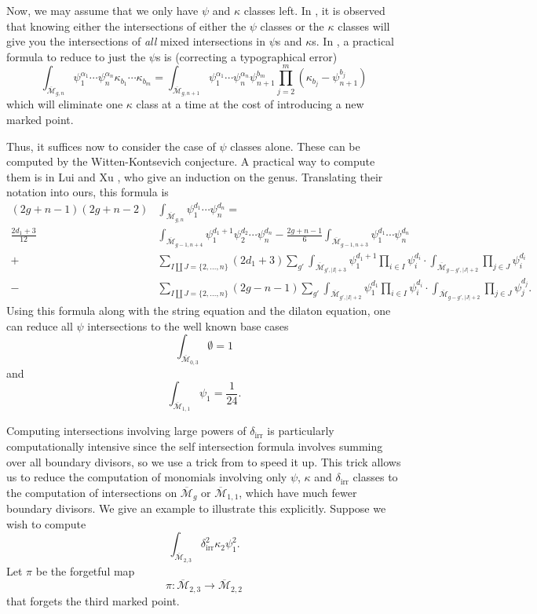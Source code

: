 \documentclass{amsart}
\newcommand{\M}[2]{\overline{\mathcal M}_{{#1},{#2}}}
\newcommand{\Mgn}{\M gn}
\newcommand{\di}{\delta_{\text{irr}}}
\begin{document}
Now, we may assume that we only have $\psi$ and $\kappa$ classes left.  In \cite{AC}, it is observed that knowing either the intersections of either the $\psi$ classes or the $\kappa$ classes will give you the intersections of \emph{all} mixed intersections in $\psi$s and $\kappa$s.  In \cite{yang}, a practical formula to reduce to just the $\psi$s is (correcting a typographical error)
\[
\int_{\Mgn} \psi_1^{\alpha_1} \cdots \psi_n^{\alpha_n} \kappa_{b_1} \cdots \kappa_{b_m} = \int_{\M{g}{n+1}}  \psi_1^{\alpha_1} \cdots \psi_n^{\alpha_n}\psi_{n+1}^{b_m} \prod_{j = 2}^m (\kappa_{b_j} - \psi_{n+1}^{b_j})
\]
which will eliminate one $\kappa$ class at a time at the cost of introducing a new marked point.  

Thus, it suffices now to consider the case of $\psi$ classes alone.  These can be computed by the Witten-Kontsevich conjecture.  A practical way to compute them is in Lui and Xu \cite{liu-xu}, who give an induction on the genus.  Translating their notation into ours, this formula is 
\begin{align*}
 (2g +n-1) (2g+n - 2) &\int_{\Mgn} \psi_1^{d_1} \cdots \psi_n^{d_n} = \\
 \frac{2d_1 + 3}{12} &\int_{\M{g-1}{n+4}} \psi_1^{d_1+1} \psi_2^{d_2} \cdots \psi_n^{d_n} - \frac{2g+n-1}{6} \int_{\M{g-1}{n+3}} \psi_1^{d_1} \cdots \psi_n^{d_n} \\ 
 	+ &\sum_{I \coprod J = \{2, \dots, n\}}  (2d_1 +3) \sum_{g'}\int_{\M{g'}{|I| + 3}} \psi_1^{d_1 + 1} \prod_{i \in I} \psi_i^{d_i} \cdot \int_{\M{g-g'}{|J| + 2}} \prod_{j \in J} \psi_i^{d_i} \\
 	- &\sum_{I \coprod J = \{2, \dots, n\}}  (2g-n-1) \sum_{g'}\int_{\M{g'}{|I| + 2}} \psi_1^{d_1} \prod_{i \in I} \psi_i^{d_i} \cdot \int_{\M{g-g'}{|J| +2}} \prod_{j \in J} \psi_j^{d_j}.
\end{align*}
Using this formula along with the string equation and the dilaton equation, one can reduce all $\psi$ intersections to the well known base cases
\[
 \int_{\M03} \emptyset = 1
\]
and
\[
	\int_{\M11} \psi_1 = \frac{1}{24}.
\]

Computing intersections involving large powers of $\di$ is particularly computationally intensive since the self intersection formula involves summing over all boundary divisors, so we use a trick from \cite{faber} to speed it up.  This trick allows us to reduce the computation of monomials involving only $\psi$, $\kappa$ and $\di$ classes to the computation of intersections on $\overline{\mathcal M}_g$ or $\M11$, which have much fewer boundary divisors.  We give an example to illustrate this explicitly.  Suppose we wish to compute
\begin{equation}
	\int_{\M23} \di^2 \kappa_2 \psi_1^2. \label{eq:compute-trick}
\end{equation}
Let $\pi$ be the forgetful map
\[
	\pi: \M23 \rightarrow \M22
\]
that forgets the third marked point.
\end{document}
